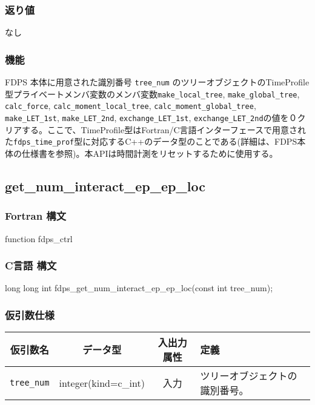\subsubsection*{返り値}
なし

\subsubsection*{機能}
FDPS 本体に用意された識別番号 \texttt{tree\_num} のツリーオブジェクトのTimeProfile型プライベートメンバ変数のメンバ変数\texttt{make\_local\_tree}, \texttt{make\_global\_tree}, \texttt{calc\_force}, \texttt{calc\_moment\_local\_tree}, \texttt{calc\_moment\_global\_tree}, \texttt{make\_LET\_1st}, \texttt{make\_LET\_2nd}, \texttt{exchange\_LET\_1st}, \texttt{exchange\_LET\_2nd}の値を０クリアする。ここで、TimeProfile型はFortran/C言語インターフェースで用意された\texttt{fdps\_time\_prof}型に対応するC++のデータ型のことである(詳細は、FDPS本体の仕様書を参照)。本APIは時間計測をリセットするために使用する。
\clearpage

\subsection{get\_num\_interact\_ep\_ep\_loc}
\subsubsection*{Fortran 構文}
\begin{screen}
\begin{spverbatim}
function fdps_ctrl%
\end{spverbatim}
\end{screen}

\subsubsection*{C言語 構文}
\begin{screen}
\begin{spverbatim}
long long int fdps_get_num_interact_ep_ep_loc(const int tree_num); 
\end{spverbatim}
\end{screen}

\subsubsection*{仮引数仕様}
\begin{table}[h]
\begin{tabularx}{\linewidth}{cccX}
\toprule
\rowcolor{Snow2}
仮引数名 & データ型 & 入出力属性 & 定義 \\
\midrule
\verb|tree_num|  & integer(kind=c\_int)   & 入力     & ツリーオブジェクトの識別番号。\\
\bottomrule
\end{tabularx}
\end{table}

